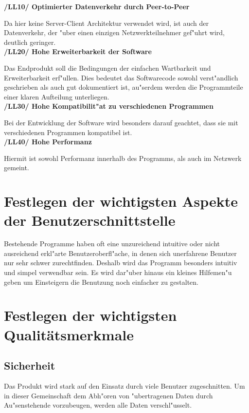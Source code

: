 \documentclass[a4paper,12pt]{scrreprt}
\begin{document}
	   \textbf{/LL10/ Optimierter Datenverkehr durch Peer-to-Peer}
		
		Da hier keine Server-Client Architektur verwendet wird, ist auch der Datenverkehr, der "uber einen einzigen Netzwerkteilnehmer gef"uhrt wird, deutlich geringer.\\
		\textbf {/LL20/ Hohe Erweiterbarkeit der Software}
		
		Das Endprodukt soll die Bedingungen der einfachen Wartbarkeit und Erweiterbarkeit erf"ullen. Dies bedeutet das Softwarecode sowohl verst"andlich geschrieben als auch gut dokumentiert ist, au"serdem werden die Programmteile einer klaren Aufteilung unterliegen.\\
		\textbf {/LL30/ Hohe Kompatibilit"at zu verschiedenen Programmen}
		
		Bei der Entwicklung der Software wird besonders darauf geachtet, dass sie mit verschiedenen Programmen kompatibel ist.\\
		\textbf {/LL40/ Hohe Performanz}
		
		Hiermit ist sowohl Performanz innerhalb des Programms, als auch im Netzwerk gemeint.
		
	\section{Festlegen der wichtigsten Aspekte der Benutzerschnittstelle}
		
	Bestehende Programme haben oft eine unzureichend intuitive oder nicht ausreichend erkl"arte Benutzeroberfl"ache, in denen sich unerfahrene Benutzer nur sehr schwer zurechtfinden. Deshalb wird das Programm besonders intuitiv und simpel verwendbar sein. Es wird dar"uber hinaus ein kleines Hilfemen"u geben um Einsteigern die Benutzung noch einfacher zu gestalten.
	
	
		
	\section{Festlegen der wichtigsten Qualit\"atsmerkmale}
		
	\subsection{Sicherheit}
	Das Produkt wird stark auf den Einsatz durch viele Benutzer zugeschnitten. Um in dieser Gemeinschaft dem Abh"oren von "ubertragenen Daten durch Au"senstehende vorzubeugen, werden alle Daten verschl"usselt.
		 
\end{document}
